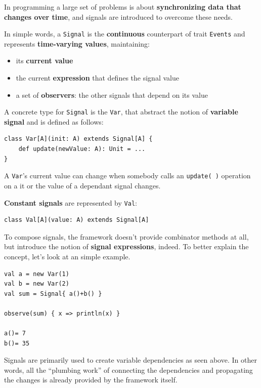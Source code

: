In programming a large set of problems is about \textbf{synchronizing
data that changes over time}, and signals are introduced to overcome
these needs.

In simple words, a \texttt{Signal} is the \textbf{continuous}
counterpart of trait \texttt{Events} and represents \textbf{time-varying
values}, maintaining:

\begin{itemize}
\itemsep1pt\parskip0pt
\item
  its \textbf{current value}
\item
  the current \textbf{expression} that defines the signal value
\item
  a set of \textbf{observers}: the other signals that depend on its
  value
\end{itemize}

A concrete type for \texttt{Signal} is the \texttt{Var}, that abstract
the notion of \textbf{variable signal} and is defined as follows:

\begin{verbatim}
class Var[A](init: A) extends Signal[A] {
    def update(newValue: A): Unit = ...
}
\end{verbatim}

A \texttt{Var}'s current value can change when somebody calls an
\texttt{update(\ )} operation on a it or the value of a dependant signal
changes.

\textbf{Constant signals} are represented by \texttt{Val}:

\begin{verbatim}
class Val[A](value: A) extends Signal[A]
\end{verbatim}

To compose signals, the framework doesn't provide combinator methods at
all, but introduce the notion of \textbf{signal expressions}, indeed. To
better explain the concept, let's look at an simple example.

\begin{verbatim}
val a = new Var(1)
val b = new Var(2)
val sum = Signal{ a()+b() }

observe(sum) { x => println(x) }

a()= 7
b()= 35
\end{verbatim}

Signals are primarily used to create variable dependencies as seen
above. In other words, all the ``plumbing work'' of connecting the
dependencies and propagating the changes is already provided by the
framework itself.

